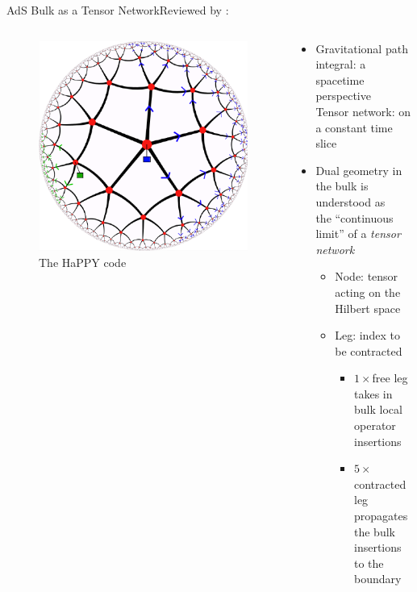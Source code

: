 \documentclass[aspectratio=169,10pt
	,noamsthm
]{beamer}
\begin{document}
\begin{frame}{AdS Bulk as a Tensor Network}{Reviewed by \textcite{Harlow:2018fse}:\,}
	\begin{columns}
	\begin{column}{.35\textwidth}
		\begin{figure}[!h]
		\centering
		\includegraphics[height=.55\textheight]{img/pentagonpush.pdf}
		\caption{The HaPPY code \cite{Pastawski:2015qua,Harlow:2018fse}}
		\end{figure}
	\end{column}
	\begin{column}{.65\textwidth}
		\begin{itemize}
		\item Gravitational path integral: a spacetime perspective\\
		Tensor network: on a constant time slice
	\pause
		\item Dual geometry in the bulk is understood as\\ the ``continuous limit'' of a \textit{tensor network}\\
			\begin{itemize}
			\item Node: tensor acting on the Hilbert space
			\item Leg: index to be contracted
				\begin{itemize}
				\item $1\times{}$free leg \\takes in bulk local operator insertions
				\item $5\times{}$contracted leg \\propagates the bulk insertions to the boundary
				\end{itemize}
			\end{itemize}
		\end{itemize}
	\end{column}
	\end{columns}
\end{frame}
\end{document}

